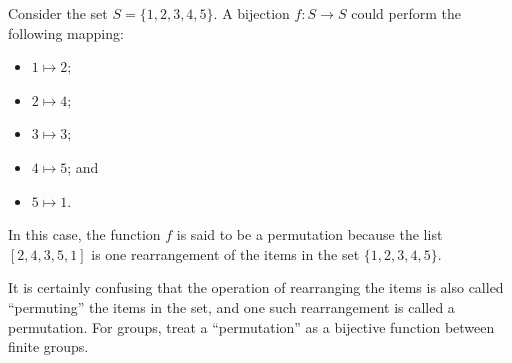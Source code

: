 \begin{example}
    Consider the set $S = \{1, 2, 3, 4, 5\}$. A bijection $f: S \to S$ could perform the following mapping:
    \begin{multicols}{3}
        \begin{itemize}
            \item $1 \mapsto 2$;
            \item $2 \mapsto 4$;
            \item $3 \mapsto 3$;
            \item $4 \mapsto 5$; and
            \item $5 \mapsto 1$.
        \end{itemize}
    \end{multicols}
    In this case, the function $f$ is said to be a permutation because the list $[2, 4, 3, 5, 1]$ is one rearrangement of the items in the set $\{1, 2, 3, 4, 5\}$.
\end{example}

\begin{remark}
    It is certainly confusing that the operation of rearranging the items is also called ``permuting'' the items in the set, and one such rearrangement is called a permutation. For groups, treat a ``permutation'' as a bijective function between finite groups.
\end{remark}

